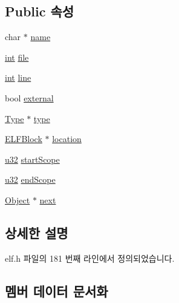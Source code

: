 \subsection*{Public 속성}
\begin{DoxyCompactItemize}
\item 
char $\ast$ \mbox{\hyperlink{struct_object_a1792dbef505e3bb7eab133117b431010}{name}}
\item 
\mbox{\hyperlink{_util_8cpp_a0ef32aa8672df19503a49fab2d0c8071}{int}} \mbox{\hyperlink{struct_object_a378b52bc4620a2ec9df0f0d3d0a1b48a}{file}}
\item 
\mbox{\hyperlink{_util_8cpp_a0ef32aa8672df19503a49fab2d0c8071}{int}} \mbox{\hyperlink{struct_object_aa3f350a46fefbb0a82c0a00dede2294a}{line}}
\item 
bool \mbox{\hyperlink{struct_object_add5f5917bb52d63d6b80e56c8f48ba59}{external}}
\item 
\mbox{\hyperlink{struct_type}{Type}} $\ast$ \mbox{\hyperlink{struct_object_ae0e4e287e6fcefa00b8ae4e4c127ffa9}{type}}
\item 
\mbox{\hyperlink{struct_e_l_f_block}{E\+L\+F\+Block}} $\ast$ \mbox{\hyperlink{struct_object_ad1adf7cf51dfe7a95d2802696f93bd0f}{location}}
\item 
\mbox{\hyperlink{_system_8h_a10e94b422ef0c20dcdec20d31a1f5049}{u32}} \mbox{\hyperlink{struct_object_a15512a3ed1b2415c37a5d240a215cbb4}{start\+Scope}}
\item 
\mbox{\hyperlink{_system_8h_a10e94b422ef0c20dcdec20d31a1f5049}{u32}} \mbox{\hyperlink{struct_object_a897fd61737cc389e4660eb6df0f54a4f}{end\+Scope}}
\item 
\mbox{\hyperlink{struct_object}{Object}} $\ast$ \mbox{\hyperlink{struct_object_a29524055e3b5fe5df2e3c41fa81ff1ff}{next}}
\end{DoxyCompactItemize}


\subsection{상세한 설명}


elf.\+h 파일의 181 번째 라인에서 정의되었습니다.



\subsection{멤버 데이터 문서화}
\mbox{\label{struct_object_a897fd61737cc389e4660eb6df0f54a4f}} 
